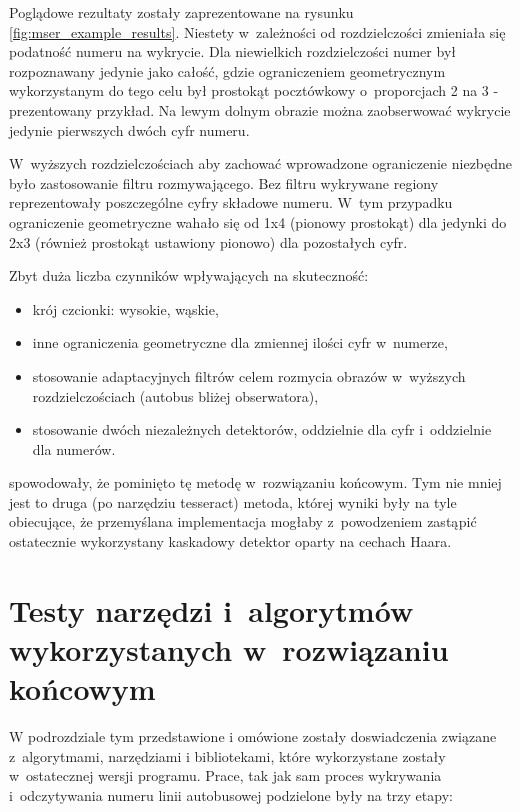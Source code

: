 Poglądowe rezultaty zostały zaprezentowane na rysunku
\ref{fig:mser_example_results}.
Niestety w~zależności od rozdzielczości zmieniała się podatność
numeru na wykrycie. Dla niewielkich rozdzielczości numer był rozpoznawany
jedynie jako całość, gdzie ograniczeniem geometrycznym wykorzystanym
do tego celu był prostokąt pocztówkowy o~proporcjach 2 na 3 - prezentowany
przykład. Na lewym dolnym obrazie można zaobserwować wykrycie jedynie
pierwszych dwóch cyfr numeru.

W~wyższych rozdzielczościach aby zachować wprowadzone ograniczenie
niezbędne było zastosowanie filtru rozmywającego. Bez filtru
wykrywane regiony reprezentowały poszczególne cyfry składowe numeru.
W~tym przypadku ograniczenie geometryczne wahało się od 1x4 (pionowy
prostokąt) dla jedynki do 2x3 (również prostokąt ustawiony pionowo) dla
pozostałych cyfr.

Zbyt duża liczba czynników wpływających na skuteczność:

\begin{itemize}
    \item krój czcionki: wysokie, wąskie,
    \item inne ograniczenia geometryczne dla zmiennej ilości cyfr
        w~numerze,
    \item stosowanie adaptacyjnych filtrów celem rozmycia obrazów
        w~wyższych rozdzielczościach (autobus bliżej obserwatora),
    \item stosowanie dwóch niezależnych detektorów, oddzielnie dla
        cyfr i~oddzielnie dla numerów.
\end{itemize}

spowodowały, że pominięto tę metodę w~rozwiązaniu końcowym.
Tym nie mniej jest to druga (po narzędziu tesseract) metoda, której
wyniki były na tyle obiecujące, że przemyślana implementacja
mogłaby z~powodzeniem zastąpić ostatecznie wykorzystany kaskadowy
detektor oparty na cechach Haara.


\section{Testy narzędzi i~algorytmów wykorzystanych w~rozwiązaniu 
	końcowym}

W podrozdziale tym przedstawione i omówione zostały doswiadczenia związane
z~algorytmami, narzędziami i bibliotekami, które wykorzystane zostały
w~ostatecznej wersji programu. Prace, tak jak sam proces wykrywania 
i~odczytywania numeru linii autobusowej podzielone były na trzy etapy:

